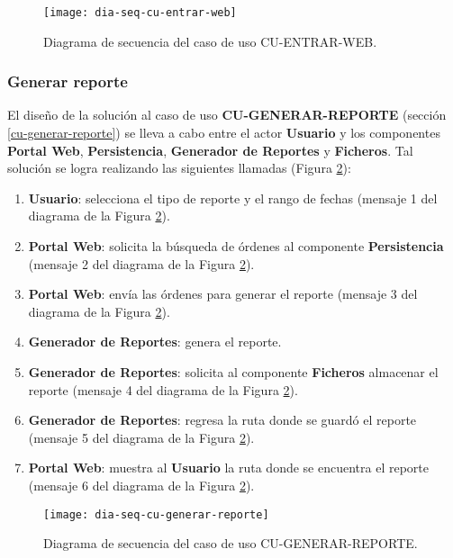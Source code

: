 \begin{figure}[h]
	\centering
	\texttt{[image: dia-seq-cu-entrar-web]}
	\caption{Diagrama de secuencia del caso de uso CU-ENTRAR-WEB.}
	\label{fig:dia-seq-cu-entrar-web}
\end{figure}

\subsubsection{Generar reporte}
El diseño de la solución al caso de uso \textbf{CU-GENERAR-REPORTE} (sección \ref{cu-generar-reporte}) se lleva a cabo entre el actor \textbf{Usuario} y los componentes \textbf{Portal Web}, \textbf{Persistencia}, \textbf{Generador de Reportes} y \textbf{Ficheros}. Tal solución se logra realizando las siguientes llamadas (Figura \ref{fig:dia-seq-cu-generar-reporte}):
\begin{enumerate}
	\item \textbf{Usuario}: selecciona el tipo de reporte y el rango de fechas (mensaje 1 del diagrama de la Figura \ref{fig:dia-seq-cu-generar-reporte}).
	\item \textbf{Portal Web}: solicita la búsqueda de órdenes al componente \textbf{Persistencia} (mensaje 2 del diagrama de la Figura \ref{fig:dia-seq-cu-generar-reporte}).
	\item \textbf{Portal Web}: envía las órdenes para generar el reporte (mensaje 3 del diagrama de la Figura \ref{fig:dia-seq-cu-generar-reporte}).
	\item \textbf{Generador de Reportes}: genera el reporte.
	\item \textbf{Generador de Reportes}: solicita al componente \textbf{Ficheros} almacenar el reporte (mensaje 4 del diagrama de la Figura \ref{fig:dia-seq-cu-generar-reporte}).
	\item \textbf{Generador de Reportes}: regresa la ruta donde se guardó el reporte (mensaje 5 del diagrama de la Figura \ref{fig:dia-seq-cu-generar-reporte}).
	\item \textbf{Portal Web}: muestra al \textbf{Usuario} la ruta donde se encuentra el reporte (mensaje 6 del diagrama de la Figura \ref{fig:dia-seq-cu-generar-reporte}).
\end{enumerate}

\begin{figure}[h]
	\centering
	\texttt{[image: dia-seq-cu-generar-reporte]}
	\caption{Diagrama de secuencia del caso de uso CU-GENERAR-REPORTE.}
	\label{fig:dia-seq-cu-generar-reporte}
\end{figure}

